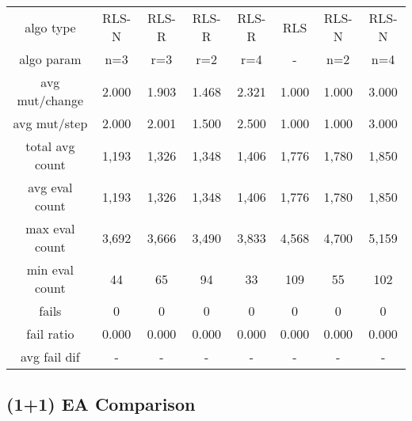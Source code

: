 \begin{tabular}[h]{cccccccc}
algo type&            RLS-N&     RLS-R&     RLS-R&     RLS-R&       RLS&     RLS-N&     RLS-N\\
algo param&             n=3&       r=3&       r=2&       r=4&         -&       n=2&       n=4\\
avg mut/change&       2.000&     1.903&     1.468&     2.321&     1.000&     1.000&     3.000\\
avg mut/step&         2.000&     2.001&     1.500&     2.500&     1.000&     1.000&     3.000\\
\hline
total avg count&      1,193&     1,326&     1,348&     1,406&     1,776&     1,780&     1,850\\
avg eval count&       1,193&     1,326&     1,348&     1,406&     1,776&     1,780&     1,850\\
max eval count&       3,692&     3,666&     3,490&     3,833&     4,568&     4,700&     5,159\\
min eval count&          44&        65&        94&        33&       109&        55&       102\\
\hline
fails&                    0&         0&         0&         0&         0&         0&         0\\
fail ratio&           0.000&     0.000&     0.000&     0.000&     0.000&     0.000&     0.000\\
avg fail dif&             -&         -&         -&         -&         -&         -&         -\\
\end{tabular}


\subsection{(1+1) EA Comparison}


